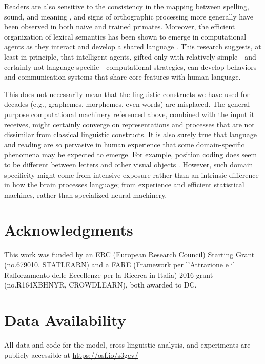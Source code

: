 \documentclass[doc,biblatex]{apa7}
\begin{document}
Readers are also sensitive to the consistency in the mapping between spelling, sound, and meaning \parencite{Marelli:2015, Ulicheva:2020}, and signs of orthographic processing more generally have been observed in both naive \parencite{Rajalingham:2018} and trained \parencite{Grainger:2012} primates. Moreover, the efficient organization of lexical semantics has been shown to emerge in computational agents as they interact and develop a shared language \parencite{Chaabouni:2021}. This research suggests, at least in principle, that intelligent agents, gifted only with relatively simple---and certainly not language-specific---computational strategies, can develop behaviors and communication systems that share core features with human language.

This does not necessarily mean that the linguistic constructs we have used for decades (e.g., graphemes, morphemes, even words) are misplaced. The general-purpose computational machinery referenced above, combined with the input it receives, might certainly converge on representations and processes that are not dissimilar from classical linguistic constructs. It is also surely true that language and reading are so pervasive in human experience that some domain-specific phenomena may be expected to emerge. For example, position coding does seem to be different between letters and other visual objects \parencite{Dunabeitia:2012}. However, such domain specificity might come from intensive exposure rather than an intrinsic difference in how the brain processes language; from experience and efficient statistical machines, rather than specialized neural machinery.

\section{Acknowledgments}

This work was funded by an ERC (European Research Council) Starting Grant (no.\@ 679010, STATLEARN) and a FARE (Framework per l'Attrazione e il Rafforzamento delle Eccellenze per la Ricerca in Italia) 2016 grant (no.\@ R164XBHNYR, CROWDLEARN), both awarded to DC.

\section{Data Availability}

All data and code for the model, cross-linguistic analysis, and experiments are publicly accessible at \url{https://osf.io/s3gev/}
\end{document}
